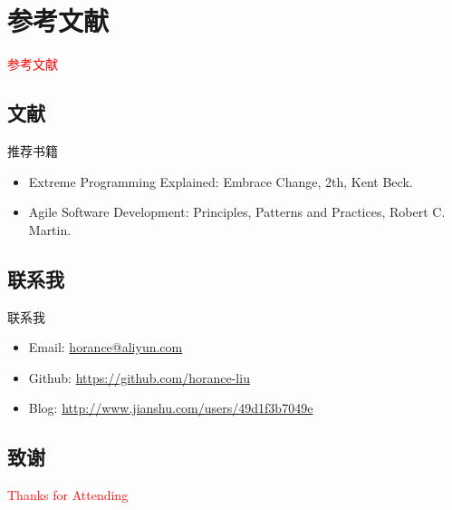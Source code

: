 \section{参考文献}
\label{sec:reference}

\begin{frame}
  \begin{center}
    \Huge{\textcolor{red}{参考文献}}
  \end{center}
\end{frame}

\subsection{文献}

\begin{frame}{推荐书籍}
  \begin{itemize}
    \item \alert{Extreme Programming Explained: Embrace Change, 2th}, Kent Beck.
    \item \alert{Agile Software Development: Principles, Patterns and Practices}, Robert C. Martin.
  \end{itemize}
\end{frame}

\subsection{联系我}

\begin{frame}{联系我}
    \begin{itemize}
    \item \alert{Email}: \href{horance@aliyun.com}{horance@aliyun.com}
    \item \alert{Github}: \href{https://github.com/horance-liu}{https://github.com/horance-liu} 
    \item \alert{Blog}: \href{http://www.jianshu.com/users/49d1f3b7049e}{http://www.jianshu.com/users/49d1f3b7049e}
    \end{itemize}
\end{frame}

\subsection{致谢}

\begin{frame}{}
  \begin{center}
    \Huge{\textcolor{red}{Thanks for Attending}}
  \end{center}
\end{frame}